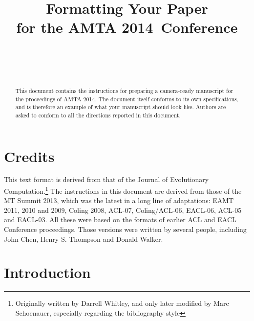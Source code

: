 \documentclass[]{article}
\newcommand{\confname}{AMTA 2014}
\begin{document}
\title{\bf Formatting Your Paper \\
  for the \confname~Conference}  

\author{ \hfill  {}\\ 
         \hfill {}\\ 
\AND
        \hfill {}\\
}

\maketitle
\pagestyle{empty}

\begin{abstract}
  This document contains the instructions for preparing a camera-ready
  manuscript for the proceedings of \confname . The document itself
  conforms to its own specifications, and is therefore an example of
  what your manuscript should look like. Authors are asked to conform
  to all the directions reported in this document.
\end{abstract}

\section{Credits}

This text format is derived from that of the Journal of Evolutionary
Computation.\footnote{Originally written by Darrell Whitley, and only
  later modified by Marc Schoenauer, especially regarding the
  bibliography style} The instructions in this document are derived
from those of the MT Summit 2013, %
which was the latest in a long line of adaptations: EAMT 2011, 2010
and 2009, Coling 2008, ACL-07, Coling/ACL-06, EACL-06, ACL-05 and
EACL-03.  All these were based on the formats of earlier ACL and EACL
Conference proceedings.  Those versions were written by several
people, including John Chen, Henry S. Thompson and Donald Walker.

\section{Introduction}
\end{document}
